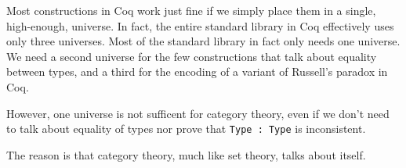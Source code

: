 Most constructions in Coq work just fine if we simply place them in a single, high-enough, universe.
In fact, the entire standard library in Coq effectively uses only three universes.
Most of the standard library in fact only needs one universe.
We need a second universe for the few constructions that talk about equality between types, and a third for the encoding of a variant of Russell's paradox in Coq.

However, one universe is not sufficent for category theory, even if we don't need to talk about equality of types nor prove that \texttt{Type : Type} is inconsistent.

The reason is that category theory, much like set theory, talks about itself.
